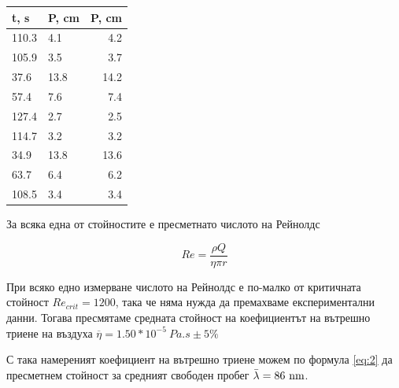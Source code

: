 \documentclass[%
 reprint,
 amsmath,amssymb,
 aps,
]{revtex4-2}
\begin{document}
\begin{table}[H]
    \centering
    \begin{tabular}{@{}llr@{}} \toprule
    t, s  & P, cm & P, cm \\
    \midrule
    110.3 & 4.1        & 4.2        \\
    105.9 & 3.5        & 3.7        \\
    37.6  & 13.8       & 14.2       \\
    57.4  & 7.6        & 7.4        \\
    127.4 & 2.7        & 2.5        \\
    114.7 & 3.2        & 3.2        \\
    34.9  & 13.8       & 13.6       \\
    63.7  & 6.4        & 6.2        \\
    108.5 & 3.4        & 3.4        \\
    \bottomrule
    \end{tabular}%
\end{table}

За всяка една от стойностите е пресметнато числото на Рейнолдс 

\begin{equation*}
    Re = \frac{\rho Q}{\eta \pi r} 
\end{equation*}

При всяко едно измерване числото на Рейнолдс е по-малко от критичната стойност $Re_{crit} = 1200$, така че няма нужда да премахваме експериментални данни. Тогава пресмятаме средната стойност на коефициентът на вътрешно триене на въздуха $\overline{\eta} = 1.50*10^{-5} \ \si{Pa.s} \pm 5\%$

С така намереният коефициент на вътрешно триене можем по формула \eqref{eq:2} да пресметнем стойност за средният свободен пробег $\bar{\lambda} = 86 \ \si[]{nm}$.
\end{document}
